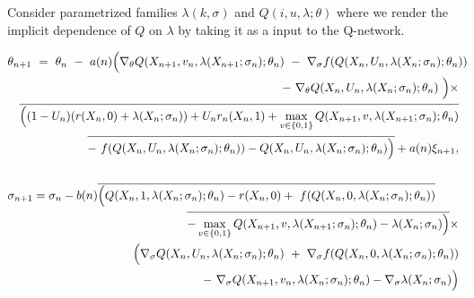 \documentclass{article}
\theoremstyle{definition}
\begin{document}
Consider parametrized families $\lambda(k,\sigma)$ and $Q(i , u, \lambda; \theta)$ where we render the implicit dependence of $Q$ on $\lambda$ by taking it as a input to the Q-network.

\begin{eqnarray*}
\lefteqn{\theta_{n+1} \ = \  \theta_n \ - \  a(n)\Big(\nabla_\theta Q(X_{n+1},v_n,\lambda(X_{n+1};\sigma_n);\theta_n)\ - \ \nabla_\sigma f(Q(X_n,U_n,\lambda(X_n;\sigma_n);\theta_n))}\nonumber\\
&& - \ \nabla_\theta Q(X_n,U_n,\lambda(X_n;\sigma_n);\theta_n)\ \Big)\times  \nonumber\\
&&\overline{\Big((1-U_n)(r(X_n,0) + \lambda(X_n;\sigma_n)) + U_nr_n(X_n,1) + \max_{v\in\{0,1\}}Q(X_{n+1},v,\lambda(X_{n+1};\sigma_n);\theta_n)}\nonumber\\
&&\overline{ - \ f(Q(X_n,U_n,\lambda(X_n;\sigma_n);\theta_n))
 - Q(X_n,U_n,\lambda(X_n;\sigma_n);\theta_n)\Big)} + a(n) \xi_{n+1},\\\nonumber\\
\lefteqn{\sigma_{n+1} = \sigma_n - b(n)\overline{\Big(Q(X_n, 1,\lambda(X_n;\sigma_n);\theta_n) - r(X_n,0)  + \ f(Q(X_n,0,\lambda(X_n;\sigma_n);\theta_n))}}\nonumber\\
&& \overline{- \max_{v\in\{0,1\}}Q(X_{n+1},v,\lambda(X_{n+1};\sigma_n);\theta_n) - \lambda(X_n;\sigma_n)\Big)} \times \nonumber\\
&& \Big(\nabla_\sigma Q(X_n,U_n,\lambda(X_n;\sigma_n);\theta_n)  \ + \ \nabla_\sigma f(Q(X_n,0,\lambda(X_n;\sigma_n);\theta_n)) \nonumber\\
&& - \ \nabla_\sigma Q(X_{n+1},v_n,\lambda(X_n;\sigma_n);\theta_n) - \nabla_\sigma\lambda(X_n;\sigma_n)\Big)\\
\end{eqnarray*}





\clearpage


\end{document}
